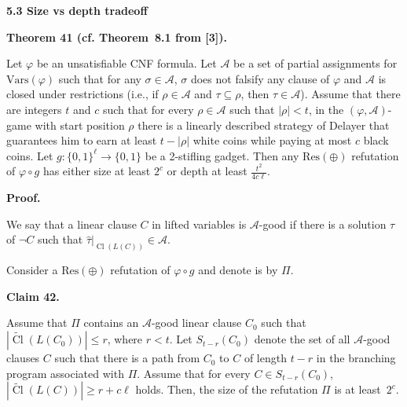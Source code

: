 \par\medskip\noindent\textbf{
5.3 Size vs depth tradeoff}\par


\par\medskip\noindent\textbf{
Theorem 41 (cf. Theorem 8.1 from [3]).
}\par



Let $\varphi$ be an unsatisfiable CNF formula. Let $\mathcal{A}$ be a set of partial assignments for $\mathrm{Vars}(\varphi)$ such that for any $\sigma\in\mathcal{A}$, $\sigma$ does not falsify any clause of $\varphi$ and $\mathcal{A}$ is closed under restrictions (i.e., if $\rho\in\mathcal{A}$ and $\tau\subseteq\rho$, then $\tau\in\mathcal{A}$). Assume that there are integers $t$ and $c$ such that for every $\rho\in\mathcal{A}$ such that $|\rho|<t$, in the $(\varphi,\mathcal{A})$-game with start position $\rho$ there is a linearly described strategy of Delayer that guarantees him to earn at least $t-|\rho|$ white coins while paying at most $c$ black coins.
Let $g\colon\{0,1\}^{\ell}\to\{0,1\}$ be a 2-stifling gadget. Then any $\mathrm{Res}(\oplus)$ refutation of $\varphi\circ g$ has either size at least $2^{c}$ or depth at least
$\frac{t^{2}}{4c\ell}$.\par



\par\medskip\noindent\textbf{Proof.}\par


We say that a linear clause $C$ in lifted variables is $\mathcal{A}$-good if there is a solution $\tau$ of $\lnot C$ such that $\hat{\tau}|_{\mathop{\mathrm{Cl}}(L(C))}\in\mathcal{A}$.\par



Consider a $\mathrm{Res}(\oplus)$ refutation of $\varphi\circ g$ and denote is by $\Pi$.\par



\par\medskip\noindent\textbf{
Claim 42. 
}\par



Assume that $\Pi$ contains an $\mathcal{A}$-good linear clause $C_{0}$ such that $|\widetilde{\mathop{\mathrm{Cl}}}(L(C_{0}))|\leq r$, where $r<t$. Let $S_{t-r}(C_{0})$ denote the set of all $\mathcal{A}$-good clauses $C$ such that there is a path from $C_{0}$ to $C$ of length $t-r$ in the branching program associated with $\Pi$.
Assume that for every $C\in S_{t-r}(C_{0})$, $|\widetilde{\mathop{\mathrm{Cl}}}(L(C))|\geq r+c\ell$ holds. Then, the size of the refutation $\Pi$ is at least $2^{c}$.\par



